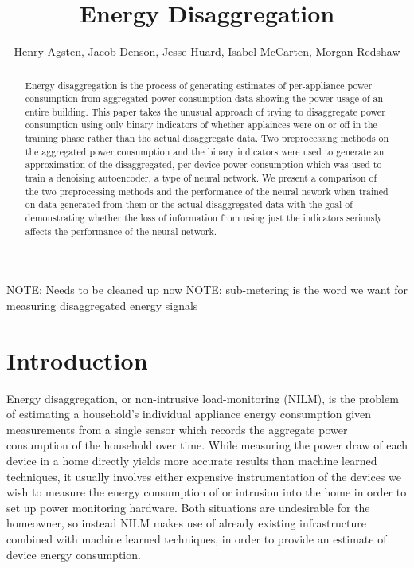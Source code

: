 \documentclass{article}
\title{Energy Disaggregation}
\author{Henry Agsten, Jacob Denson, Jesse Huard, Isabel McCarten, Morgan Redshaw}
\date{}
\begin{document}
\maketitle

\begin{abstract}
Energy disaggregation is the process of generating estimates of per-appliance power consumption from aggregated power consumption data showing the power usage of an entire building. This paper takes the unusual approach of trying to disaggregate power consumption using only binary indicators of whether applainces were on or off in the training phase rather than the actual disaggregate data. Two preprocessing methods on the aggregated power consumption and the binary indicators were used to generate an approximation of the disaggregated, per-device power consumption which was used to train a denoising autoencoder, a type of neural network. We present a comparison of the two preprocessing methods and the performance of the neural nework when trained on data generated from them or the actual disaggregated data with the goal of demonstrating whether the loss of information from using just the indicators seriously affects the performance of the neural network.

\end{abstract}

NOTE: Needs to be cleaned up now
NOTE: sub-metering is the word we want for measuring disaggregated energy signals

\section{Introduction}

Energy disaggregation, or non-intrusive load-monitoring (NILM), is the problem of estimating a household's individual appliance energy consumption given measurements from a single sensor which records the aggregate power consumption of the household over time.
While measuring the power draw of each device in a home directly yields more accurate results than machine learned techniques, it usually involves either expensive instrumentation of the devices we wish to measure the energy consumption of or intrusion into the home in order to set up power monitoring hardware.
Both situations are undesirable for the homeowner, so instead NILM makes use of already existing infrastructure combined with machine learned techniques, in order to provide an estimate of device energy consumption.
\end{document}
